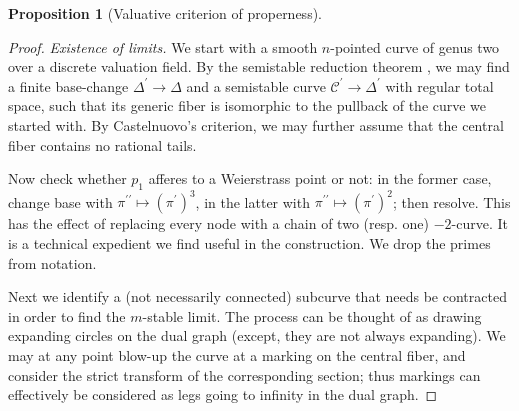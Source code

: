 \documentclass[11pt]{amsart}
\renewcommand{\to}{\rightarrow}
\newcommand{\dvr}{\Delta}
\theoremstyle{plain}
\newtheorem{prop}[thm]{Proposition}
\theoremstyle{definition}
\begin{document}
\begin{prop}[Valuative criterion of properness]
 
\end{prop}
\begin{proof}
 \emph{Existence of limits.}
  We start with a smooth $n$-pointed curve of genus two over a discrete valuation field. By the semistable reduction theorem \cite[Corollary 2.7]{DM}, we may find a finite base-change $\dvr^\prime\to\dvr$ and a semistable curve $\mathcal C^\prime\to\dvr^\prime$ with regular total space, such that its generic fiber is isomorphic to the pullback of the curve we started with. By Castelnuovo's criterion, we may further assume that the central fiber contains no rational tails.
  
  Now check whether $p_1$ afferes to a Weierstrass point or not: in the former case, change base with $\pi^{\prime\prime}\mapsto(\pi^\prime)^3$, in the latter with $\pi^{\prime\prime}\mapsto(\pi^\prime)^2$; then resolve. This has the effect of replacing every node with a chain of two (resp. one) $-2$-curve. It is a technical expedient we find useful in the construction. We drop the primes from notation.
  
  Next we identify a (not necessarily connected) subcurve that needs be contracted in order to find the $m$-stable limit. The process can be thought of as drawing expanding circles on the dual graph (except, they are not always expanding). We may at any point blow-up the curve at a marking on the central fiber, and consider the strict transform of the corresponding section; thus markings can effectively be considered as legs going to infinity in the dual graph.
  

\end{proof}
\end{document}

